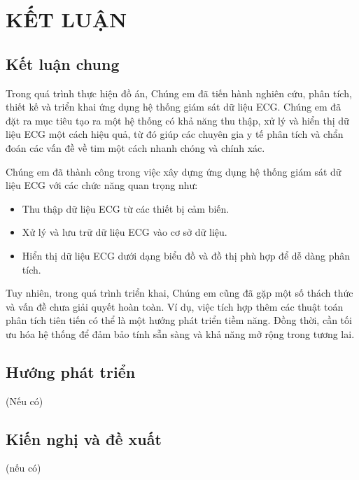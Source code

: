 
\section*{KẾT LUẬN}
\subsection*{Kết luận chung}


Trong quá trình thực hiện đồ án, Chúng em đã tiến hành nghiên cứu, phân tích, thiết kế và triển khai ứng dụng hệ thống giám sát dữ liệu ECG. Chúng em đã đặt ra mục tiêu tạo ra một hệ thống có khả năng thu thập, xử lý và hiển thị dữ liệu ECG một cách hiệu quả, từ đó giúp các chuyên gia y tế phân tích và chẩn đoán các vấn đề về tim một cách nhanh chóng và chính xác.

Chúng em đã thành công trong việc xây dựng ứng dụng hệ thống giám sát dữ liệu ECG với các chức năng quan trọng như:


\begin{adjustwidth}{2em}{}
  \begin{itemize}
      \item Thu thập dữ liệu ECG từ các thiết bị cảm biến.
  
      \item Xử lý và lưu trữ dữ liệu ECG vào cơ sở dữ liệu.
  
      \item Hiển thị dữ liệu ECG dưới dạng biểu đồ và đồ thị phù hợp để dễ dàng phân tích.

    \end{itemize}
  \end{adjustwidth}


Tuy nhiên, trong quá trình triển khai, Chúng em cũng đã gặp một số thách thức và vấn đề chưa giải quyết hoàn toàn. Ví dụ, việc tích hợp thêm các thuật toán phân tích tiên tiến có thể là một hướng phát triển tiềm năng. Đồng thời, cần tối ưu hóa hệ thống để đảm bảo tính sẵn sàng và khả năng mở rộng trong tương lai.

\subsection*{Hướng phát triển}
(Nếu có) \cite{nhu2019effects}

\subsection*{Kiến nghị và đề xuất}
(nếu có)

\cleardoublepage